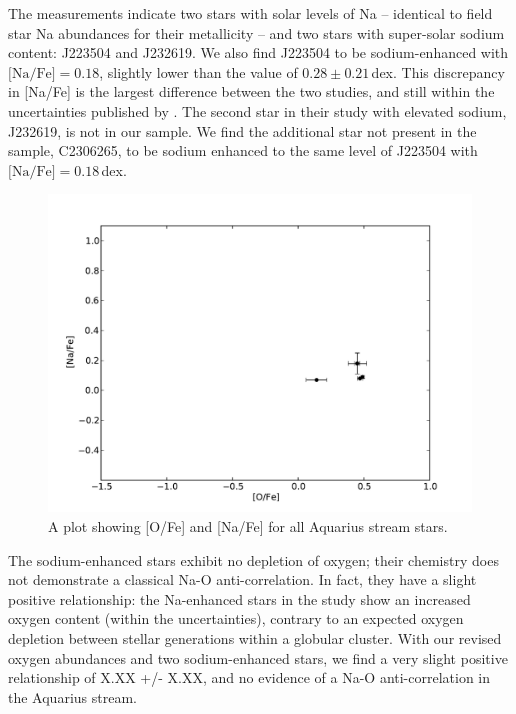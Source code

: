 \documentclass{emulateapj}
\begin{document}





The \citet{wylie-de-boer;et-al_2012} measurements indicate two stars with solar levels of Na \--- identical to field star Na abundances for their metallicity \--- and two stars with super-solar sodium content: J223504 and J232619.
We also find J223504 to be sodium-enhanced with $\mbox{[Na/Fe]} = 0.18$, slightly lower than the \citet{wylie-de-boer;et-al_2012} value of $0.28 \pm 0.21$\,dex. This discrepancy in [Na/Fe] is the largest difference between the two studies, and still within the uncertainties published by \citet{wylie-de-boer;et-al_2012}. The second star in their study with elevated sodium, J232619, is not in our sample. We find the additional star not present in the \citet{wylie-de-boer;et-al_2012} sample, C2306265, to be sodium enhanced to the same level of J223504 with $\mbox{[Na/Fe]} = 0.18$\,dex.

\begin{figure}[h]
	\includegraphics[width=\columnwidth]{./figures/aquarius-o-na.pdf}
	\caption{A plot showing [O/Fe] and [Na/Fe] for all Aquarius stream stars.}
	\label{fig:o-na}
\end{figure}


The sodium-enhanced stars exhibit no depletion of oxygen; their chemistry does not demonstrate a classical Na-O anti-correlation. In fact, they have a slight positive relationship: the Na-enhanced stars in the \citet{wylie-de-boer;et-al_2012} study show an increased oxygen content (within the uncertainties), contrary to an expected oxygen depletion between stellar generations within a globular cluster. With our revised oxygen abundances and two sodium-enhanced stars, we find a very slight positive relationship of X.XX +/- X.XX, and no evidence of a Na-O anti-correlation in the Aquarius stream. 
\end{document}
